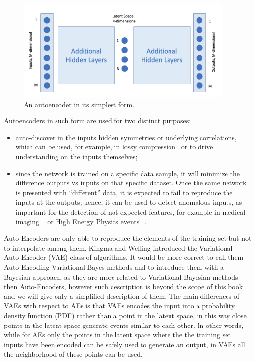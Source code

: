 \begin{figure}[htb]
     \centering
     \includegraphics[width=0.95\textwidth]{images/autoencoder.png}
     \caption{An autoencoder in its simplest form.}
     \label{fig:autoencoder}
 \end{figure}
 
 Autoencoders in such form are used for two distinct purposes:
 \begin{itemize}
     \item auto-discover in the inputs hidden symmetries or underlying correlations, which can be used, for example, in lossy compression~\cite{compression} or to drive understanding on the inputs themselves; %
     \item since the network is trained on a specific data sample, it will minimize the difference outputs vs inputs on that specific dataset. Once the same network is presented with ``different'' data, it is expected to fail to reproduce the inputs at the outputs; hence, it can be used to detect anomalous inputs, as important for the detection of not expected features, for example in medical imaging ~\cite{anomalymed} or High Energy Physics events ~\cite{anomalyhep}. 
 \end{itemize}
 
Auto-Encoders are only able to reproduce the elements of the training set but not to interpolate among them. Kingma and Welling \cite{vae} introduced the Variational Auto-Encoder (VAE) class of algorithms. It would be more correct to call them Auto-Encoding Variational Bayes methods 
and to introduce them with a Bayesian approach, as they are more related to Variational Bayesian methods then Auto-Encoders, however such description is beyond the scope of this book and we will give only a simplified description of them. 
The main differences of VAEs with respect to AEs is that VAEs encodes the input into a probability density function (PDF) rather than a point in the latent space, in this way close points in the latent space generate events similar to each other.
In other words, while for AEs only the points in the latent space where the the training set inputs have been encoded can be safely used to generate an output, in VAEs all the neighborhood of these points can be used.


